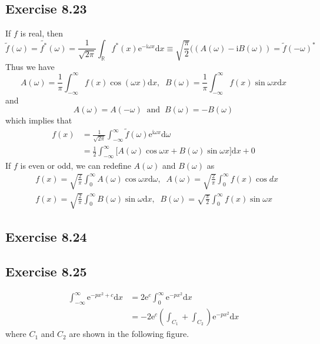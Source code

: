 \documentclass[]{ctexart}
\begin{document}
\subsection{Exercise 8.23}
If $f$ is real, then 
\begin{equation*}
\tilde{f}(\omega)=\widetilde{f^*}(\omega)=\frac{1}{\sqrt{2\pi}}\int_{\mathbb R}f^*(x)\mathrm{e}^{-\mathrm{i}\omega x}\mathrm{d}x\equiv\sqrt{\frac{\pi}{2}}((A(\omega)-\mathrm{i}B(\omega))=\tilde{f}(-\omega)^*
\end{equation*}
Thus we have 
\begin{equation*}
A(\omega)=\frac{1}{\pi}\int_{-\infty}^\infty f(x)\cos(\omega x)\mathrm{d}x,\;\;B(\omega)=\frac{1}{\pi}\int_{-\infty}^\infty f(x)\sin\omega x\mathrm{d}x
\end{equation*}
and
\begin{equation*}
A(\omega)=A(-\omega)\;\;\text{and}\;\;B(\omega)=-B(\omega)
\end{equation*}
which implies that 
\begin{align*}
f(x)&=\frac{1}{\sqrt{2\pi}}\int_{-\infty}^{\infty}\tilde{f}(\omega)\mathrm{e}^{\mathrm{i}\omega x}\mathrm{d}\omega\\
&=\frac{1}{2}\int_{-\infty}^\infty\big[A(\omega)\cos\omega x+B(\omega)\sin\omega x\big]\mathrm{d}x+0
\end{align*}
If $f$ is even or odd, we can redefine $A(\omega)$ and $B(\omega)$ as 
\begin{align*}
&f(x)=\sqrt{\frac{2}{\pi}}\int_0^\infty A(\omega)\cos\omega x\mathrm{d}\omega,\;\;A(\omega)=\sqrt{\frac{2}{\pi}}\int_0^\infty f(x)\cos dx\\
&f(x)=\sqrt{\frac{2}{\pi}}\int_0^\infty B(\omega)\sin\omega\mathrm{d}x,\;\;B(\omega)=\sqrt{\frac{\pi}{2}}\int_0^\infty f(x)\sin\omega x
\end{align*}

\subsection{Exercise 8.24}

\subsection{Exercise 8.25}
\begin{align*}
\int_{-\infty}^{\infty}\mathrm{e}^{-px^2+c}\mathrm{d}x&=2\mathrm{e}^c\int_0^\infty\mathrm{e}^{-px^2}\mathrm{d}x\\
&=-2\mathrm{e}^c\left(\int_{C_1}+\int_{C_2}\right)\mathrm{e}^{-px^2}\mathrm{d}x
\end{align*}
where $C_1$ and $C_2$ are shown in the following figure. 
\end{document}
